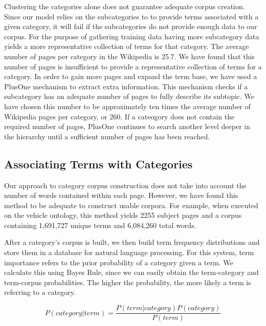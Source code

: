 Clustering the categories alone does not guarantee adequate corpus
creation. Since our model relies on the subcategories to
to provide terms associated with a given category, it will fail if
the subcategories do not provide enough data to our corpus.
For the purpose of gathering training data having more subcategory data
yields a more representative collection of terms for that category. 
The average number of pages per category in the Wikipedia is 25.7\cite{1321474}.
We have found that this number of pages is insufficient to provide a representative collection of terms for a category.
In order to gain more pages and expand the term base, we have used a
PlusOne mechanism to extract
extra information. This mechanism checks if a subcategory has an
adequate number of pages to fully describe its subtopic.
We have chosen this number to be approximately ten times the average
number of Wikipedia pages per category, or 260.  If a cateogory
does not contain the required number of pages, PlusOne continues to
search another level deeper in the hierarchy until a sufficient
number of pages has been reached.


\subsection{Associating Terms with Categories}
\label{sec:terms}

Our approach to category corpus construction does not take into
account the number of words contained within each page.
However, we have found this method to be adequate to construct
usable corpora. For example, when executed on the vehicle ontology,
this method yields 2255 subject pages and a corpus containing
1,691,727 unique terms and 6,084,260 total words.

After a category's corpus is built, we then build term frequency
distributions and store them in a database for natural language processing.
For this system, term importance refers to the prior probability
of a category given a term. We calculate this using Bayes Rule,
since we can easily obtain the term-category and term-corpus
probabilities. The higher the probability, the more likely a term is
referring to a category.

\begin{equation}
P (category | term) = \frac{P(term | category) P(category)}{P(term)}
\end{equation}
